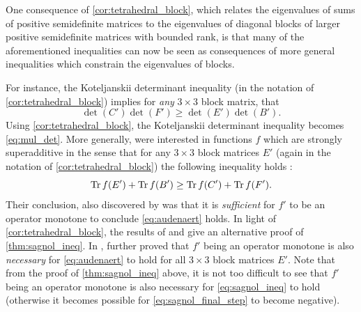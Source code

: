 \documentclass[notitlepage, 10pt]{article}
\begin{document}
\begin{rem}
    One consequence of \cref{cor:tetrahedral_block}, which relates the eigenvalues of sums of positive semidefinite matrices to the eigenvalues of diagonal blocks of larger positive semidefinite matrices with bounded rank, is that many of the aforementioned inequalities can now be seen as consequences of more general inequalities which constrain the eigenvalues of blocks.
    
    For instance, the Koteljanskii determinant inequality \cite{johnson1993determinantal} (in the notation of \cref{cor:tetrahedral_block}) implies for \textit{any} $3\times 3$ block matrix, that
    \begin{equation}
        \det(C')\det(F') \geq \det(E')\det(B').
    \end{equation}
    Using \cref{cor:tetrahedral_block}, the Koteljanskii determinant inequality becomes \cref{eq:mul_det}.
    More generally, \citeauthor{audenaert2010strongly} were interested in functions $f$ which are strongly superadditive in the sense that for any $3\times 3$ block matrices $E'$ (again in the notation of \cref{cor:tetrahedral_block}) the following inequality holds \cite{audenaert2010strongly}:
    \begin{equation}
        \label{eq:audenaert}
        \operatorname{Tr} f(E') + \operatorname{Tr} f(B') \geq \operatorname{Tr} f(C') + \operatorname{Tr} f(F').
    \end{equation}
    Their conclusion, also discovered by \citeauthor{friedland2013submodular} \cite{friedland2013submodular} was that it is \textit{sufficient} for $f'$ to be an operator monotone to conclude \cref{eq:audenaert} holds.
    In light of \cref{cor:tetrahedral_block}, the results of \citeauthor{audenaert2010strongly} and \cite{friedland2013submodular} give an alternative proof of \cref{thm:sagnol_ineq}.
    In \cite{lewin2014family}, \citeauthor{lewin2014family} further proved that $f'$ being an operator monotone is also \textit{necessary} for \cref{eq:audenaert} to hold for all $3\times 3$ block matrices $E'$.
    Note that from the proof of \cref{thm:sagnol_ineq} above, it is not too difficult to see that $f'$ being an operator monotone is also necessary for \cref{eq:sagnol_ineq} to hold (otherwise it becomes possible for \cref{eq:sagnol_final_step} to become negative).
\end{rem}
\end{document}
